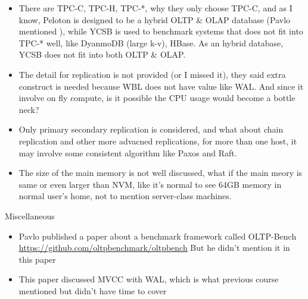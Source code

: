 \documentclass[12pt,a4paper,oneside]{article}
\begin{document}
\begin{itemize}
  \item There are TPC-C, TPC-H, TPC-*, why they only choose TPC-C, and as I know,
Peloton is designed to be a hybrid OLTP \& OLAP database (Pavlo mentioned ), while YCSB is used to benchmark
systems that does not fit into TPC-* well, like DyanmoDB (large k-v), HBase. As
an hybrid database, YCSB does not fit into both OLTP \& OLAP.
  \item The detail for replication is not provided (or I missed it), they said extra
construct is needed because WBL does not have value like WAL. And since it involve on fly
compute, is it possible the CPU usage would become a bottle neck?
  \item Only primary secondary replication is considered, and what about chain replication
and other more advacned replications, for more than one host, it may involve some consistent
algorithm like Paxos and Raft.
  \item The size of the main memory is not well discussed, what if the main meory is same or
even larger than NVM, like it's normal to see 64GB memory in normal user's home, not to mention
server-class machines.
\end{itemize}

Miscellaneous

\begin{itemize}
  \item Pavlo published a paper about a benchmark framework called OLTP-Bench \url{https://github.com/oltpbenchmark/oltpbench}
But he didn't mention it in this paper
  \item This paper discussed MVCC with WAL, which is what previous course mentioned but didn't have time to cover
\end{itemize}
\end{document}
